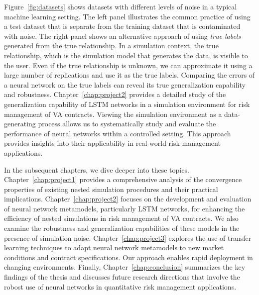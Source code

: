 Figure~\ref{fig:datasets} shows datasets with different levels of noise in a typical machine learning setting.
The left panel illustrates the common practice of using a test dataset that is separate from the training dataset that is contaminated with noise.
The right panel shows an alternative approach of using \textit{true labels} generated from the true relationship.
In a simulation context, the true relationship, which is the simulation model that generates the data, is visible to the user.
Even if the true relationship is unknown, we can approximate it using a large number of replications and use it as the true labels.
Comparing the errors of a neural network on the true labels can reveal its true generalization capability and robustness.
Chapter~\ref{chap:project2} provides a detailed study of the generalization capability of LSTM networks in a simulation environment for risk management of VA contracts.
Viewing the simulation environment as a data-generating process allows us to systematically study and evaluate the performance of neural networks within a controlled setting.
This approach provides insights into their applicability in real-world risk management applications.

In the subsequent chapters, we dive deeper into these topics.
Chapter~\ref{chap:project1} provides a comprehensive analysis of the convergence properties of existing nested simulation procedures and their practical implications.
Chapter~\ref{chap:project2} focuses on the development and evaluation of neural network metamodels, particularly LSTM networks, for enhancing the efficiency of nested simulations in risk management of VA contracts.
We also examine the robustness and generalization capabilities of these models in the presence of simulation noise.
Chapter~\ref{chap:project3} explores the use of transfer learning techniques to adapt neural network metamodels to new market conditions and contract specifications.
Our approach enables rapid deployment in changing environments.
Finally, Chapter~\ref{chap:conclusion} summarizes the key findings of the thesis and discusses future research directions that involve the robost use of neural networks in quantitative risk management applications.
